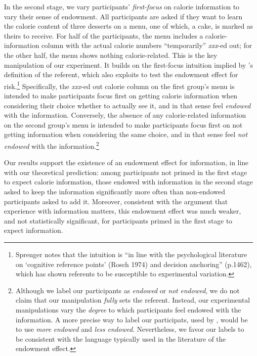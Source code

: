 In the second stage, we vary participants' \emph{first-focus} on calorie information to vary their sense of endowment. All participants are asked if they want to learn the calorie content of three desserts on a menu, one of which, a cake, is marked as theirs to receive. For half of the participants, the menu includes a calorie-information column with the actual calorie numbers \enquote{temporarily} \emph{xxx}-ed out; for the other half, the menu shows nothing calorie-related. This is the key manipulation of our experiment. It builds on the first-focus intuition implied by \citet{koszegiModelReferenceDependentPreferences2006}'s definition of the referent, which \citet{sprengerEndowmentEffectRisk2015} also exploits to test the endowment effect for risk.\footnote{Sprenger notes that the intuition is \enquote{in line with the psychological literature on \enquote{cognitive reference points} (Rosch 1974) and decision anchoring} (p.1462), which has shown referents to be susceptible to experimental variation.} Specifically, the \emph{xxx}-ed out calorie column on the first group's menu is intended to make participants focus first on getting calorie information when considering their choice whether to actually see it, and in that sense feel \emph{endowed} with the information. Conversely, the absence of any calorie-related information on the second group's menu is intended to make participants focus first on not getting information when considering the same choice, and in that sense feel \emph{not endowed} with the information.\footnote{Although we label our participants as \emph{endowed} or \emph{not endowed}, we do not claim that our manipulation \emph{fully} sets the referent. Instead, our experimental manipulations vary the \emph{degree} to which participants feel endowed with the information. A more precise way to label our participats, used by \citet{heffetzEndowmentEffectExpectations2014}, would be to use \emph{more endowed} and \emph{less endowed}. Nevertheless, we favor our labels to be consistent with the language typically used in the literature of the endowment effect.}

Our results support the existence of an endowment effect for information, in line with our theoretical prediction: among participants not primed in the first stage to expect calorie information, those endowed with information in the second stage asked to keep the information significantly more often than non-endowed participants asked to add it. Moreover, consistent with the argument that experience with information matters, this endowment effect was much weaker, and not statistically significant, for participants primed in the first stage to expect information.

